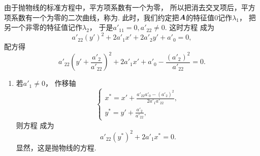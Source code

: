 \begin{enumerate}
	由于抛物线的标准方程中，平方项系数有一个为零，
	所以把消去交叉项后，平方项系数有一个为零的二次曲线，称为.
	此时，我们约定把\(\boldsymbol{A}\)的特征值\(0\)记作\(\lambda_1\)，
	把另一个非零的特征值记作\(\lambda_2\)，
	于是\(
		a'_{11} = 0,
		a'_{22} \neq 0
	\).
	这时方程  成为\begin{equation*}
		a'_{22} (y')^2 + 2 a'_1 x' + 2 a'_2 y' + a'_0 = 0,
	\end{equation*}
	配方得\begin{equation}\label{equation:二次曲线方程的化简及其类型.配方后所得方程}
		a'_{22} \left( y' + \frac{a'_2}{a'_{22}} \right)^2
		+ 2 a'_1 x'
		+ a'_0 - \frac{(a'_2)^2}{a'_{22}} = 0.
	\end{equation}
	\begin{enumerate}
		\item 若\(a'_1 \neq 0\)，
		作移轴\begin{equation*}
			\left\{ \begin{array}{l}
				x^* = x' + \frac{a'_{22} a'_0 - (a'_2)^2}{2 a'_1 a'_{22}}, \\
				y^* = y' + \frac{a'_2}{a'_{22}},
			\end{array} \right.
		\end{equation*}
		则方程 
		成为\begin{equation*}
			a'_{22} (y^*)^2 + 2 a'_1 x^* = 0.
		\end{equation*}
		显然，这是抛物线的方程.


\end{enumerate}
\end{enumerate}
